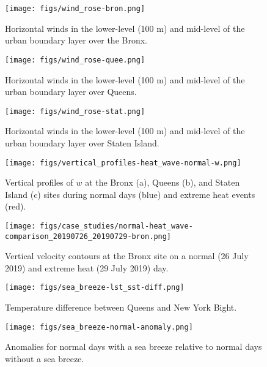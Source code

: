 \documentclass[11pt,a4paper]{article}
\begin{document}
\begin{figure}[ht]
	\texttt{[image: figs/wind\_rose-bron.png]}
	\caption{Horizontal winds in the lower-level (100 m) and mid-level of the urban boundary layer over the Bronx.}
	\label{fig:wind_rose-bron}
\end{figure}
\begin{figure}[ht]
	\centering
	\texttt{[image: figs/wind\_rose-quee.png]}
	\caption{Horizontal winds in the lower-level (100 m) and mid-level of the urban boundary layer over Queens.}
	\label{fig:wind_rose-quee}
\end{figure}
\begin{figure}[ht]
	\centering
	\texttt{[image: figs/wind\_rose-stat.png]}
	\caption{Horizontal winds in the lower-level (100 m) and mid-level of the urban boundary layer over Staten Island.}
	\label{fig:wind_rose-stat}
\end{figure}

\begin{figure}[ht]
	\centering
	\texttt{[image: figs/vertical\_profiles-heat\_wave-normal-w.png]}
	\caption{Vertical profiles of $w$ at the Bronx (a), Queens (b), and Staten Island (c) sites during normal days (blue) and extreme heat events (red).}
	\label{fig:extreme-heat-normal-vertical_profiles-w}
\end{figure}

\begin{figure}[ht]
	\centering
	\texttt{[image: figs/case\_studies/normal-heat\_wave-comparison\_20190726\_20190729-bron.png]}
	\caption{Vertical velocity contours at the Bronx site on a normal (26 July 2019) and extreme heat (29 July 2019) day.}
	\label{fig:normal-extreme_heat-w-case_study}
\end{figure}

\begin{figure}[ht]
	\centering
	\texttt{[image: figs/sea\_breeze-lst\_sst-diff.png]}
	\caption{Temperature difference between Queens and New York Bight.}
	\label{fig:sea_breeze-lst_sst-diff}
\end{figure}

\begin{figure}[ht]
	\centering
	\texttt{[image: figs/sea\_breeze-normal-anomaly.png]}
	\caption{Anomalies for normal days with a sea breeze relative to normal days without a sea breeze.}
	\label{fig:sea_breeze_normal-normal-anomaly}
\end{figure}
\end{document}
